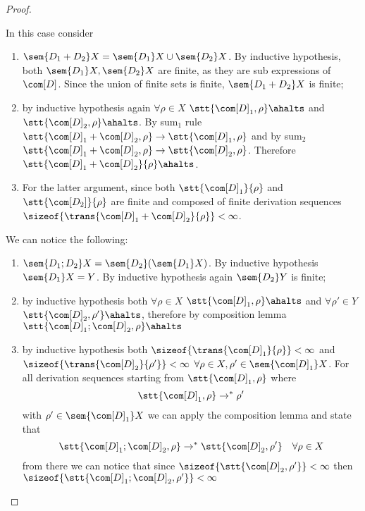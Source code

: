 \begin{proof}
\begin{inductive}
    \case{\({\com[D]} = \com[D_1 + D_2]\)} In this case consider
    \begin{enumerate}[label=(\roman*).]
    \item \(\sem{D_1 + D_2} X = \sem{D_1}X \cup \sem{D_2}X\). By
      inductive hypothesis, both \(\sem{D_1}X, \sem{D_2}X\) are
      finite, as they are sub expressions of \({\com[D]}\). Since the
      union of finite sets is finite, \(\sem{D_1 + D_2}X\) is finite;
    \item by inductive hypothesis again \(\forall \rho \in X\)
      \(\stt{{\com[D]}_1, \rho}\ahalts\) and
      \(\stt{{\com[D]}_2, \rho}\ahalts\). By sum\(_1\) rule
      \(\stt{{\com[D]}_1 + {\com[D]}_2, \rho} \to \stt{{\com[D]}_1, \rho}\)
      and by sum\(_2\)
      \(\stt{{\com[D]}_1 + {\com[D]}_2, \rho} \to \stt{{\com[D]}_2,
        \rho}\). Therefore
      \(\stt{{\com[D]}_1 + {\com[D]}_2}{\rho}\ahalts\).
    \item For the latter argument, since both
      \(\stt{{\com[D]}_1}{\rho}\) and \(\stt{\com[D_2]}{\rho}\) are
      finite and composed of finite derivation sequences
      \(\sizeof{\trans{{\com[D]}_1 + {\com[D]}_2}{\rho}} < \infty\).
    \end{enumerate}
    \case{\({\com[D]} = \com[D_1; D_2]\)} We can notice the
    following:
    \begin{enumerate}[label=(\roman*).]
    \item \(\sem{D_1;D_2}X = \sem{D_2}(\sem{D_1}X)\). By inductive
      hypothesis \(\sem{D_1}X = Y\). By inductive hypothesis again
      \(\sem{D_2}Y\) is finite;
    \item by inductive hypothesis both \(\forall \rho \in X\)
      \(\stt{{\com[D]}_1, \rho}\ahalts\) and \(\forall \rho' \in Y\)
      \(\stt{{\com[D]}_2,\rho'}\ahalts\), therefore by composition
      lemma \(\stt{{\com[D]}_1;{\com[D]}_2, \rho} \ahalts\)
    \item by inductive hypothesis both
      \(\sizeof{\trans{{\com[D]}_1}{\rho}} < \infty\) and
      \(\sizeof{\trans{{\com[D]}_2}{\rho'}} < \infty\)
      \(\forall \rho \in X, \rho'\in \sem{{\com[D]}_1}X\). For all
      derivation sequences starting from \(\stt{{\com[D]}_1, \rho}\)
      where \[\stt{{\com[D]}_1, \rho} \to^* \rho'\] with
      \(\rho'\in \sem{{\com[D]}_1}X\) we can apply the composition lemma
      and state that
      \[\stt{{\com[D]}_1;{\com[D]}_2, \rho} \to^* \stt{{\com[D]}_2, \rho'} \quad
        \forall \rho \in X\] from there we can notice that since
      \(\sizeof{\stt{{\com[D]}_2, \rho'}} < \infty\) then
      \(\sizeof{\stt{{\com[D]}_1;{\com[D]}_2, \rho'}} < \infty\)
    \end{enumerate}
  \end{inductive}
\end{proof}


